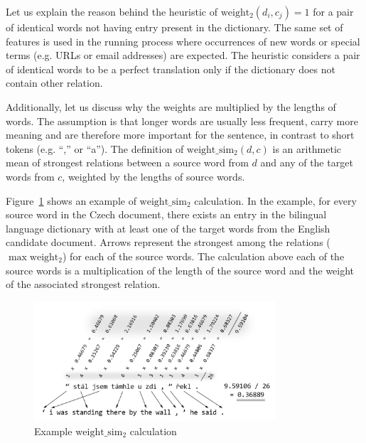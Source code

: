 \begin{itemize}
	Let us explain the reason behind the heuristic of $\operatorname{weight_2}(d_i, c_j)=1$ for a pair of identical words not having entry present in the dictionary. The same set of features is used in the running process where occurrences of new words or special terms (e.g. URLs or email addresses) are expected. The heuristic considers a pair of identical words to be a perfect translation only if the dictionary does not contain other relation.
	
	Additionally, let us discuss why the weights are multiplied by the lengths of words. The assumption is that longer words are usually less frequent, carry more meaning and are therefore more important for the sentence, in contrast to short tokens (e.g. ``,'' or ``a''). The definition of $\operatorname{weight\_sim_2}(d, c)$ is an arithmetic mean of strongest relations between a source word from $d$ and any of the target words from $c$, weighted by the lengths of source words.

	Figure~\ref{figure:weight_sim} shows an example of $\operatorname{weight\_sim_2}$ calculation. In the example, for every source word in the Czech document, there exists an entry in the bilingual language dictionary with at least one of the target words from the English candidate document. Arrows represent the strongest among the relations ($\max\operatorname{weight_2}$) for each of the source words. The calculation above each of the source words is a multiplication of the length of the source word and the weight of the associated strongest relation.
\end{itemize}
		
\begin{figure}[!htb]
	\centering
	\caption{Example $\operatorname{weight\_sim_2}$ calculation}
	\label{figure:weight_sim}
	\vspace{1em}
	\includegraphics[width=0.8\textwidth]{images/weight_sim.png}
\end{figure}

